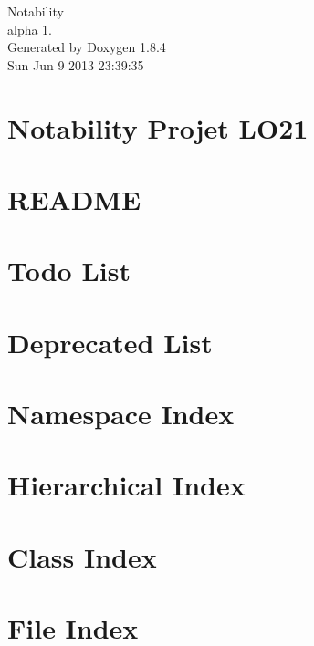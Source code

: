 \documentclass[twoside]{book}
\newcommand{\clearemptydoublepage}{%
  \newpage{\pagestyle{empty}\cleardoublepage}%
}
\begin{document}
\hypersetup{pageanchor=false}
\begin{titlepage}
\vspace*{7cm}
\begin{center}%
{\Large Notability \\[1ex]\large alpha 1. }\\
\vspace*{1cm}
{\large Generated by Doxygen 1.8.4}\\
\vspace*{0.5cm}
{\small Sun Jun 9 2013 23:39:35}\\
\end{center}
\end{titlepage}
\clearemptydoublepage
\tableofcontents
\clearemptydoublepage
{}
\hypersetup{pageanchor=true}

\chapter{Notability Projet L\-O21}
\label{index}\hypertarget{index}{}
\chapter{R\-E\-A\-D\-M\-E}
\label{md_README}
\hypertarget{md_README}{}

\chapter{Todo List}
\label{todo}
\hypertarget{todo}{}

\chapter{Deprecated List}
\label{deprecated}
\hypertarget{deprecated}{}

\chapter{Namespace Index}

\chapter{Hierarchical Index}

\chapter{Class Index}

\chapter{File Index}

\end{document}
